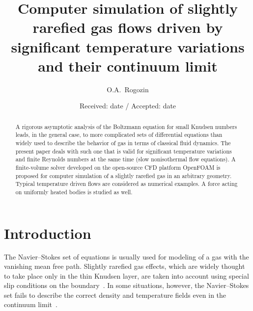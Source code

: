 \documentclass[smallextended, final]{svjour3} %
\begin{document}
\title{
    Computer simulation of slightly rarefied gas flows driven by significant temperature variations and their continuum limit
}

\author{O.A.~Rogozin}

\date{Received: date / Accepted: date}

\maketitle

\begin{abstract}
    A rigorous asymptotic analysis of the Boltzmann equation for small Knudsen numbers
    leads, in the general case, to more complicated sets of differential equations
    than widely used to describe the behavior of gas in terms of classical fluid dynamics.
    The present paper deals with such one that is valid for significant temperature variations
    and finite Reynolds numbers at the same time (slow nonisothermal flow equations).
    A finite-volume solver developed on the open-source CFD platform OpenFOAM\textregistered{}
    is proposed for computer simulation of a slightly rarefied gas in an arbitrary geometry.
    Typical temperature driven flows are considered as numerical examples.
    A force acting on uniformly heated bodies is studied as well.
\end{abstract}

\section{Introduction}

The Navier--Stokes set of equations is usually used for modeling of a gas with the vanishing mean free path.
Slightly rarefied gas effects, which are widely thought to take place only in the thin Knudsen layer,
are taken into account using special slip conditions on the boundary~\cite{SharipovCoefficients}.
In some situations, however, the Navier--Stokes set fails to describe the correct density
and temperature fields even in the continuum limit~\cite{Kogan1976}.
\end{document}
